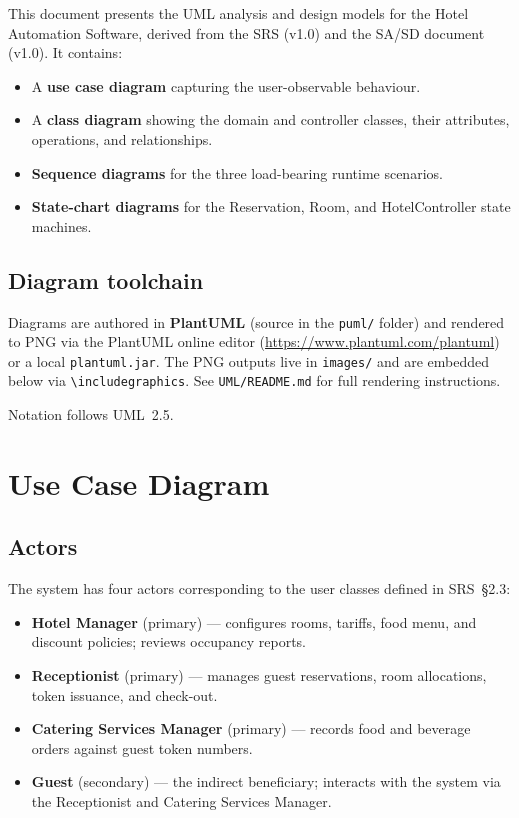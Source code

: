 \documentclass[12pt,a4paper]{article}
\begin{document}
This document presents the UML analysis and design models for the Hotel Automation
Software, derived from the SRS (v1.0) and the SA/SD document (v1.0). It contains:

\begin{itemize}[leftmargin=1.5em]
  \item A \textbf{use case diagram} capturing the user-observable behaviour.
  \item A \textbf{class diagram} showing the domain and controller classes, their
        attributes, operations, and relationships.
  \item \textbf{Sequence diagrams} for the three load-bearing runtime scenarios.
  \item \textbf{State-chart diagrams} for the Reservation, Room, and
        HotelController state machines.
\end{itemize}

\subsection*{Diagram toolchain}

Diagrams are authored in \textbf{PlantUML} (source in the \texttt{puml/} folder) and
rendered to PNG via the PlantUML online editor (\url{https://www.plantuml.com/plantuml})
or a local \texttt{plantuml.jar}. The PNG outputs live in \texttt{images/} and are
embedded below via \verb|\includegraphics|. See \texttt{UML/README.md} for full
rendering instructions.

Notation follows UML~2.5.

\newpage

\section{Use Case Diagram}

\subsection{Actors}

The system has four actors corresponding to the user classes defined in SRS~\S2.3:
\begin{itemize}[leftmargin=1.5em]
  \item \textbf{Hotel Manager} (primary) --- configures rooms, tariffs, food menu, and
        discount policies; reviews occupancy reports.
  \item \textbf{Receptionist} (primary) --- manages guest reservations, room allocations,
        token issuance, and check-out.
  \item \textbf{Catering Services Manager} (primary) --- records food and beverage orders
        against guest token numbers.
  \item \textbf{Guest} (secondary) --- the indirect beneficiary; interacts with the
        system via the Receptionist and Catering Services Manager.
\end{itemize}
\end{document}
